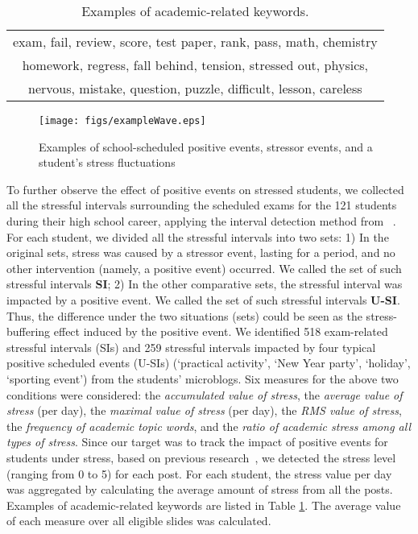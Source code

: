 \documentclass[5p,times,numbers,authoryear]{elsarticle}
\begin{document}
\begin{table}[h]
\centering
\caption{\small{Examples of academic-related keywords.}}
\label{tab:studyWords}
\small{
\begin{tabular}{c}
\toprule
exam, fail, review, score, test paper, rank, pass, math, chemistry\\
homework, regress, fall behind, tension, stressed out, physics,\\
nervous, mistake, question, puzzle, difficult, lesson, careless\\
\bottomrule
\end{tabular}
}
\end{table}


\begin{figure}[H]
\centering
\texttt{[image: figs/exampleWave.eps]}
\caption{\small{Examples of school-scheduled positive events, stressor events, and a student's stress fluctuations}}
\label{fig:example}
\end{figure}

To further observe the effect of positive events on stressed students,
we collected all the stressful intervals surrounding the scheduled exams for the 121 students during their high school career, applying the interval detection method from ~\citep{Li2017Analyzing}.
For each student, we divided all the stressful intervals into two sets:
1) In the original sets, stress was caused by a stressor event, lasting for a period,
and no other intervention (namely, a positive event) occurred.
We called the set of such stressful intervals \textbf{SI};
2) In the other comparative sets, the stressful interval was impacted by a positive event.
We called the set of such stressful intervals \textbf{U-SI}.
Thus, the difference under the two situations (sets) could be seen as the stress-buffering effect
induced by the positive event.
We identified 518 exam-related stressful intervals (SIs)
and 259 stressful intervals impacted by four typical positive scheduled events (U-SIs)
(`practical activity', `New Year party', `holiday', `sporting event') from the students' microblogs.
Six measures for the above two conditions were considered: 
the \emph{accumulated value of stress}, the \emph{average value of stress} (per day),  the \emph{maximal value of stress} (per day), the \emph{RMS value of stress},
the \emph{frequency of academic topic words}, and the \emph{ratio of academic stress among all types of stress}.
Since our target was to track the impact of positive events for students under stress,
based on previous research~\cite{XueUbicomp13}, we detected the stress level (ranging from 0 to 5) for each post.
For each student, the stress value per day was aggregated by calculating the average amount of stress from all the posts.
Examples of academic-related keywords are listed in Table \ref{tab:studyWords}.
The average value of each measure over all eligible slides was calculated.
\end{document}

